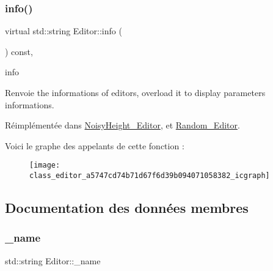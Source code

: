\subsubsection{\texorpdfstring{info()}{info()}}
{\footnotesize\ttfamily virtual std\+::string Editor\+::info (\begin{DoxyParamCaption}{ }\end{DoxyParamCaption}) const\hspace{0.3cm}{\ttfamily [inline]}, {\ttfamily [virtual]}}



info 

\begin{DoxyReturn}{Renvoie}
the informations of editors, overload it to display parameters informations. 
\end{DoxyReturn}


Réimplémentée dans \hyperlink{class_noisy_height___editor_a4749fe8cb3306252a8f48c8147854578}{Noisy\+Height\+\_\+\+Editor}, et \hyperlink{class_random___editor_aa194991b2926aeab96ad5470f549f087}{Random\+\_\+\+Editor}.

Voici le graphe des appelants de cette fonction \+:\nopagebreak
\begin{figure}[H]
\begin{center}
\leavevmode
\texttt{[image: class\_editor\_a5747cd74b71d67f6d39b094071058382\_icgraph]}
\end{center}
\end{figure}


\subsection{Documentation des données membres}
\mbox{\label{class_editor_a0ae04e135284b48561a538397106f42a}} 
\subsubsection{\texorpdfstring{\+\_\+name}{\_name}}
{\footnotesize\ttfamily std\+::string Editor\+::\+\_\+name\hspace{0.3cm}{\ttfamily [protected]}}

\mbox{\label{class_editor_ad9f31fcae91fb4a91b5ff5ecb4308bdf}} 
